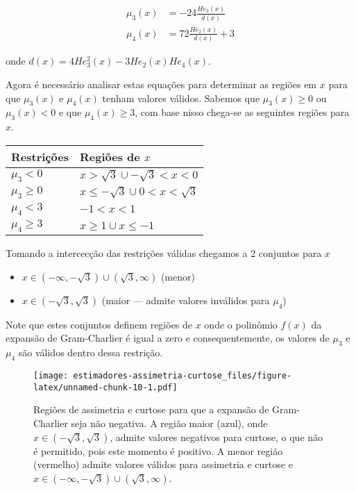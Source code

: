 \documentclass[]{article}
\providecommand{\tightlist}{%
  \setlength{\itemsep}{0pt}\setlength{\parskip}{0pt}}
\begin{document}
\[
\begin{split}
\mu_3(x) &= -24\frac{He_3(x)}{d(x)} \\
\mu_4(x) &= 72\frac{He_2(x)}{d(x)} + 3
\end{split}
\]

onde \(d(x) = 4He_3^2(x) - 3He_2(x) He_4(x)\).

Agora é necessário analisar estas equações para determinar as regiões em
\(x\) para que \(\mu_3(x)\) e \(\mu_4(x)\) tenham valores válidos.
Sabemos que \(\mu_3(x) \geq 0\) ou \(\mu_3(x) < 0\) e que
\(\mu_4(x) \geq 3\), com base nisso chega-se as seguintes regiões para
\(x\).

\begin{longtable}[]{@{}ll@{}}
\toprule
Restrições & Regiões de \(x\)\tabularnewline
\midrule
\endhead
\(\mu_3 < 0\) & \(x > \sqrt{3} \cup -\sqrt{3} < x < 0\)\tabularnewline
\(\mu_3 \geq 0\) &
\(x \leq -\sqrt{3} \cup 0 < x < \sqrt{3}\)\tabularnewline
\(\mu_4 < 3\) & \(-1 < x < 1\)\tabularnewline
\(\mu_4 \geq 3\) & \(x \geq 1 \cup x \leq -1\)\tabularnewline
\bottomrule
\end{longtable}

Tomando a intercecção das restrições válidas chegamos a 2 conjuntos para
\(x\)

\begin{itemize}
\tightlist
\item
  \(x \in (-\infty, -\sqrt{3}) \cup (\sqrt{3}, \infty)\) (menor)
\item
  \(x \in (-\sqrt{3}, \sqrt{3})\) (maior --- admite valores inválidos
  para \(\mu_4\))
\end{itemize}

Note que estes conjuntos definem regiões de \(x\) onde o polinômio
\(f(x)\) da expansão de Gram-Charlier é igual a zero e consequentemente,
os valores de \(\mu_3\) e \(\mu_4\) são válidos dentro dessa restrição.

\begin{figure}
\centering
\texttt{[image: estimadores-assimetria-curtose\_files/figure-latex/unnamed-chunk-10-1.pdf]}
\caption{\label{fig:eggs} Regiões de assimetria e curtose para que a
expansão de Gram-Charlier seja não negativa. A região maior (azul), onde
\(x \in (-\sqrt{3}, \sqrt{3})\), admite valores negativos para curtose,
o que não é permitido, pois este momento é positivo. A menor região
(vermelho) admite valores válidos para assimetria e curtose e
\(x \in (-\infty, -\sqrt{3}) \cup (\sqrt{3}, \infty)\).}
\end{figure}
\end{document}
